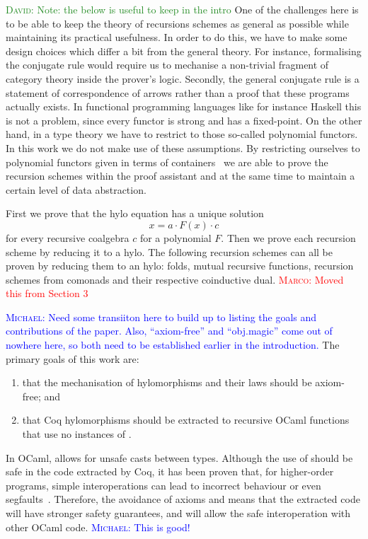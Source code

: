 \documentclass[anonymous, a4paper, UKenglish, cleveref, autoref, thm-restate]{lipics-v2021}
\newcommand{\mpav}[1]{\textcolor{red}{\textsc{Marco}: #1}}
\newcommand{\dcas}[1]{\textcolor{ForestGreen}{\textsc{David}: #1}}
\newcommand{\mvol}[1]{\textcolor{blue}{\textsc{Michael}: #1}}
\newcommand{\comp}{\cdot}
\begin{document}
\dcas{Note: the below is useful to keep in the intro}
One of the challenges here is to be able to keep the theory of recursions
schemes as general as possible while maintaining its practical usefulness. In
order to do this, we have to make some design choices which differ a bit from
the general theory.  For instance, formalising the conjugate rule would require
us to mechanise a non-trivial fragment of category theory inside the prover's
logic.  Secondly, the general conjugate rule is a statement of correspondence of
arrows rather than a proof that these programs actually exists. In functional
programming languages like for instance Haskell this is not a problem, since
every functor is strong and has a fixed-point.  On the other hand, in a type
theory we have to restrict to those so-called polynomial functors. In this work
we do not make use of these assumptions. By restricting ourselves to polynomial
functors given in terms of containers~\cite{AbbottAG05} we are able to prove the
recursion schemes within the proof assistant and at the same time to maintain a
certain level of data abstraction.

First we prove that the hylo equation has a unique solution
\[
  x = a \comp F(x) \comp c
\]
for every recursive coalgebra $c$ for a polynomial $F$. Then we prove each
recursion scheme by reducing it to a hylo. The following recursion schemes can
all be proven by reducing them to an hylo: folds, mutual recursive functions,
recursion schemes from comonads and their respective coinductive dual.
\mpav{Moved this from Section 3}

\mvol{Need some transiiton here to build up to listing the goals and contributions of the paper. Also, ``axiom-free'' and ``obj.magic'' come out of nowhere here, so both need to be established earlier in the introduction.}
The primary goals of this work are:
\begin{enumerate}
  \item that the
  mechanisation of hylomorphisms and their laws should be axiom-free; and
  \item that Coq
hylomorphisms should be extracted to recursive OCaml functions that use no
instances of .
\end{enumerate}
In OCaml,  allows for unsafe casts between types.
Although the use of  should be safe in the code
extracted by Coq, it has been proven that, for higher-order programs, simple
interoperations can lead to incorrect behaviour or even
segfaults~\cite{forster:hal-04329663}. Therefore, the avoidance of axioms and
 means that the extracted code will have stronger
safety guarantees, and will allow the safe interoperation with other OCaml code.
\mvol{This is good!}
\end{document}
